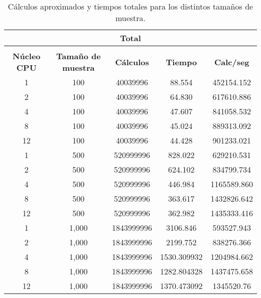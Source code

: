 \begin{table}[]
	\centering
	\begin{tabular}{|c|c|c|c|c|}
		\hline
		\multicolumn{5}{|c|}{\cellcolor[HTML]{DAE8FC}\textbf{Total}} \\ \hline
		\cellcolor[HTML]{DAE8FC} &
		\cellcolor[HTML]{DAE8FC} &
		\cellcolor[HTML]{DAE8FC} &
		\cellcolor[HTML]{DAE8FC} &
		\cellcolor[HTML]{DAE8FC} \\
		\multirow{-2}{*}{\cellcolor[HTML]{DAE8FC}\textbf{Núcleo CPU}} &
		\multirow{-2}{*}{\cellcolor[HTML]{DAE8FC}\textbf{Tamaño de muestra}} &
		\multirow{-2}{*}{\cellcolor[HTML]{DAE8FC}\textbf{Cálculos}} &
		\multirow{-2}{*}{\cellcolor[HTML]{DAE8FC}\textbf{Tiempo}} &
		\multirow{-2}{*}{\cellcolor[HTML]{DAE8FC}\textbf{Calc/seg}} \\ \hline
		1    & 100     & 40039996     & 88.554        & 452154.152   \\ \hline
		2    & 100     & 40039996     & 64.830        & 617610.886   \\ \hline
		4    & 100     & 40039996     & 47.607        & 841058.532   \\ \hline
		8    & 100     & 40039996     & 45.024        & 889313.092   \\ \hline
		12   & 100     & 40039996     & 44.428        & 901233.021   \\ \hline
		1    & 500     & 520999996    & 828.022       & 629210.531   \\ \hline
		2    & 500     & 520999996    & 624.102       & 834799.734   \\ \hline
		4    & 500     & 520999996    & 446.984       & 1165589.860  \\ \hline
		8    & 500     & 520999996    & 363.617       & 1432826.642  \\ \hline
		12   & 500     & 520999996    & 362.982       & 1435333.416  \\ \hline
		1    & 1,000   & 1843999996   & 3106.846      & 593527.943   \\ \hline
		2    & 1,000   & 1843999996   & 2199.752      & 838276.366   \\ \hline
		4    & 1,000   & 1843999996   & 1530.309932   & 1204984.662  \\ \hline
		8    & 1,000   & 1843999996   & 1282.804328   & 1437475.658  \\ \hline
		12   & 1,000   & 1843999996   & 1370.473092   & 1345520.76   \\ \hline
	\end{tabular}
	\caption{Cálculos aproximados y tiempos totales para los distintos tamaños de muestra.}
	\label{tab:calc-total}
\end{table}

